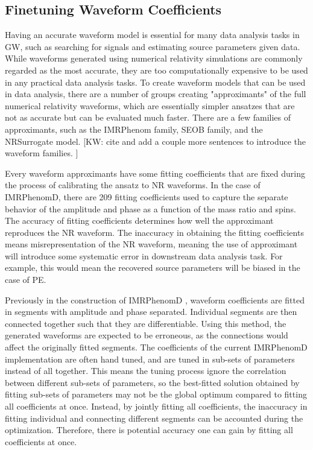 \documentclass[twocolumn]{aastex631}
\newcommand{\te}[1]{\textbf{\color{pyGreen}(TE: #1)}}
\newcommand{\kw}[1]{{\color{rb4}[KW: #1 ]}}
\begin{document}
\subsection{Finetuning Waveform Coefficients}
\label{subsec:coeffs}


Having an accurate waveform model is essential for many data analysis tasks in
GW, such as searching for signals and estimating source parameters given data.
While waveforms generated using numerical relativity simulations are commonly
regarded as the most accurate, they are too computationally expensive to be used
in any practical data analysis tasks. To create waveform models that can be used
in data analysis, there are a number of groups creating "approximants" of the
full numerical relativity waveforms, which are essentially simpler ansatzes that
are not as accurate but can be evaluated much faster. There are a few families
of approximants, such as the IMRPhenom family, SEOB family, and the NRSurrogate
model. \kw{cite and add a couple more sentences to introduce the waveform
families.}

Every waveform approximants have some fitting coefficients that are fixed during
the process of calibrating the ansatz to NR waveforms. In the case of
IMRPhenomD, there are 209 fitting coefficients used to capture the separate
behavior of the amplitude and phase as a function of the mass ratio and spins.
The accuracy of fitting coefficients determines how well the approximant
reproduces the NR waveform. The inaccuracy in obtaining the fitting coefficients
means misrepresentation of the NR waveform, meaning the use of approximant will
introduce some systematic error in downstream data analysis task. For example,
this would mean the recovered source parameters will be biased in the case of PE.

Previously in the construction of IMRPhenomD \citep{Khan:2015jqa}, waveform
coefficients are fitted in segments with amplitude and phase separated.
Individual segments are then connected together such that they are
differentiable. Using this method, the generated waveforms are expected to be
erroneous, as the connections would affect the originally fitted segments. The
coefficients of the current IMRPhenomD implementation are often hand tuned, and
are tuned in sub-sets of parameters instead of all together. This means the
tuning process ignore the correlation between different sub-sets of parameters,
so the best-fitted solution obtained by fitting sub-sets of parameters may not
be the global optimum compared to fitting all coefficients at once. Instead, by
jointly fitting all coefficients, the inaccuracy in fitting individual and
connecting different segments can be accounted during the optimization.
Therefore, there is potential accuracy one can gain by fitting all coefficients
at once.
\end{document}
